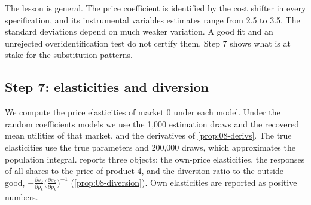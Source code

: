 The lesson is general. The price coefficient is identified by the cost shifter in every specification, and its
instrumental variables estimates range from 2.5 to 3.5. The standard deviations depend on much weaker variation. A good fit and an
unrejected overidentification test do not certify them. Step 7 shows what is at stake for the substitution patterns.

\subsection{Step 7: elasticities and diversion}\label{sec:08-worked-elas}

We compute the price elasticities of market 0 under each model. Under the random coefficients models we use the
1,000 estimation draws and the recovered mean utilities of that market, and the derivatives of
\cref{prop:08-derivs}. The true elasticities use the true parameters and 200,000 draws, which approximates the
population integral.  reports three objects: the own-price elasticities, the
responses of all shares to the price of product 4, and the diversion ratio to the outside good,
$-\frac{\partial s_0}{\partial p_k}\big(\frac{\partial s_k}{\partial p_k}\big)^{-1}$ (\cref{prop:08-diversion}). Own elasticities are
reported as positive numbers.

